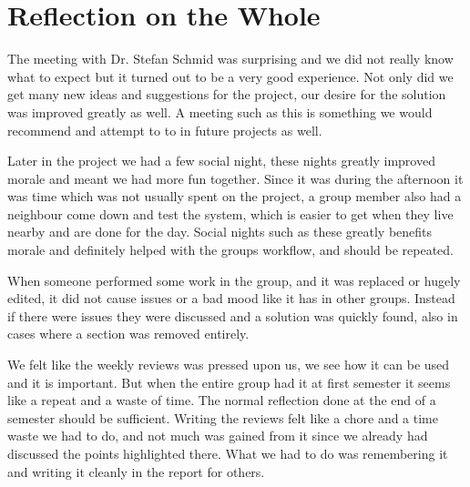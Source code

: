 \section{Reflection on the Whole}\label{sec:FinRef}
The meeting with Dr. Stefan Schmid was surprising and we did
not really know what to expect but it turned out to be a very good experience. Not only
did we get many new ideas and suggestions for the project, our desire for the
solution was improved greatly as well. A meeting such as this is something we
would recommend and attempt to to in future projects as well.

Later in the project we had a few social night, these nights greatly improved
morale and meant we had more fun together. Since it was during the afternoon it
was time which was not usually spent on the project, a group member also had a
neighbour come down and test the system, which is easier to get when they live
nearby and are done for the day. Social nights such as these greatly benefits
morale and definitely helped with the groups workflow, and should be repeated. 

When someone performed some work in the group, and it was replaced or hugely
edited, it did not cause issues or a bad mood like it has in other groups.
Instead if there were issues they were discussed and a solution was quickly
found, also in cases where a section was removed entirely. 

We felt like the weekly reviews was pressed upon us, we see how it can be used
and it is important. But when the entire group had it at first semester it seems
like a repeat and a waste of time. The normal reflection done at the end of a
semester should be sufficient. Writing the reviews felt like a chore and a time
waste we had to do, and not much was gained from it since we already had
discussed the points highlighted there. What we had to do was remembering it and
writing it cleanly in the report for others.